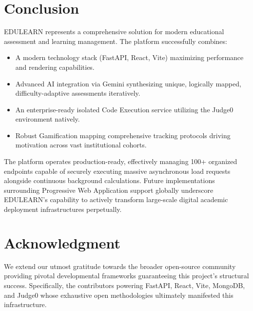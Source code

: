 \documentclass[conference]{IEEEtran}
\begin{document}
\section{Conclusion}

EDULEARN represents a comprehensive solution for modern educational assessment and learning management. The platform successfully combines:
\begin{itemize}
    \item A modern technology stack (FastAPI, React, Vite) maximizing performance and rendering capabilities.
    \item Advanced AI integration via Gemini synthesizing unique, logically mapped, difficulty-adaptive assessments iteratively.
    \item An enterprise-ready isolated Code Execution service utilizing the Judge0 environment natively.
    \item Robust Gamification mapping comprehensive tracking protocols driving motivation across vast institutional cohorts.
\end{itemize}

The platform operates production-ready, effectively managing 100+ organized endpoints capable of securely executing massive asynchronous load requests alongside continuous background calculations. Future implementations surrounding Progressive Web Application support globally underscore EDULEARN's capability to actively transform large-scale digital academic deployment infrastructures perpetually.

\section*{Acknowledgment}
We extend our utmost gratitude towards the broader open-source community providing pivotal developmental frameworks guaranteeing this project's structural success. Specifically, the contributors powering FastAPI, React, Vite, MongoDB, and Judge0 whose exhaustive open methodologies ultimately manifested this infrastructure.
\end{document}
